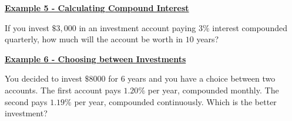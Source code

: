\documentclass[12pt]{book}
\begin{document}
\underline{\textbf{Example 5 - Calculating Compound Interest}}

If you invest $\$ 3,000$ in an investment account paying $3\%$ interest compounded quarterly, how much will the account be worth in $10$ years?


\newpage
\underline{\textbf{Example 6 - Choosing between Investments}}

You decided to invest $\$8000$ for $6$ years and you have a choice between two accounts. The first account pays $1.20\%$ per year, compounded monthly. The second pays $1.19\%$ per year, compounded continuously. Which is the better investment?




\newpage
    
        
\end{document}
